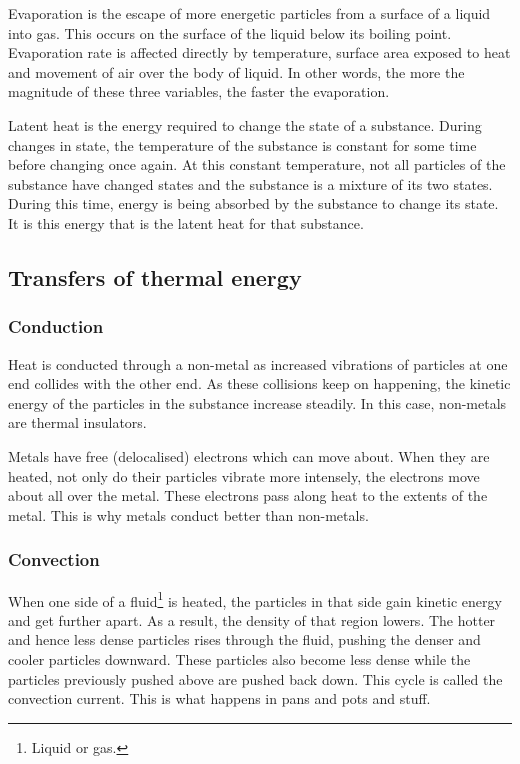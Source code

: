 Evaporation is the escape of more energetic particles from a surface of a liquid into gas. This
occurs on the surface of the liquid below its boiling point. Evaporation rate is affected directly
by temperature, surface area exposed to heat and movement of air over the body of liquid. In other
words, the more the magnitude of these three variables, the faster the evaporation.

Latent heat is the energy required to change the state of a substance. During changes in state,
the temperature of the substance is constant for some time before changing once again. At this
constant temperature, not all particles of the substance have changed states and the substance is
a mixture of its two states. During this time, energy is being absorbed by the substance to change
its state. It is this energy that is the latent heat for that substance.

\subsection{Transfers of thermal energy}
\subsubsection{Conduction}

Heat is conducted through a non-metal as increased vibrations of particles at one end collides
with the other end. As these collisions keep on happening, the kinetic energy of the particles in
the substance increase steadily. In this case, non-metals are thermal insulators.

Metals have free (delocalised) electrons which can move about. When they are heated, not only do
their particles vibrate more intensely, the electrons move about all over the metal. These 
electrons pass along heat to the extents of the metal. This is why metals conduct better than 
non-metals.

\subsubsection{Convection}

When one side of a fluid\footnote{Liquid or gas.} is heated, the particles in that side gain
kinetic energy and get further apart. As a result, the density of that region lowers. The hotter
and hence less dense particles rises through the fluid, pushing the denser and cooler particles
downward. These particles also become less dense while the particles previously pushed above are
pushed back down. This cycle is called the convection current. This is what happens in pans and
pots and stuff.

